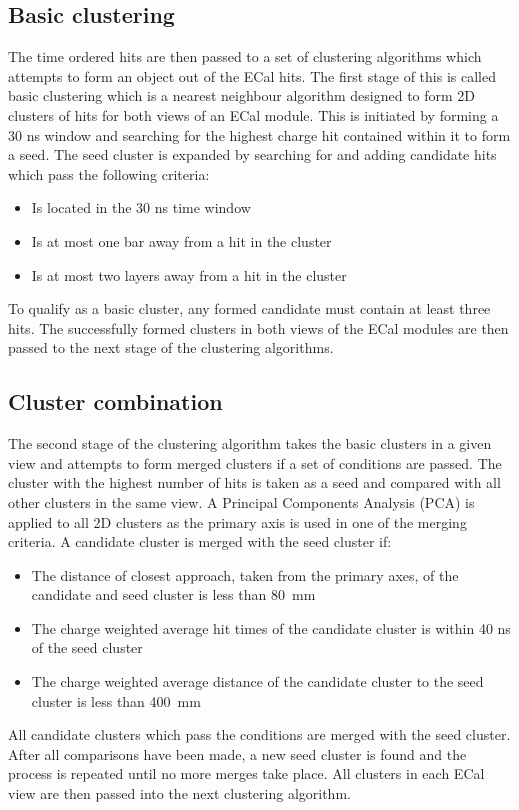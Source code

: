 \subsection{Basic clustering}
\label{subsec:ECalBasicClustering}
The time ordered hits are then passed to a set of clustering algorithms which attempts to form an object out of the ECal hits.  The first stage of this is called basic clustering which is a nearest neighbour algorithm designed to form 2D clusters of hits for both views of an ECal module.  This is initiated by forming a 30 ns window and searching for the highest charge hit contained within it to form a seed.  The seed cluster is expanded by searching for and adding candidate hits which pass the following criteria:
\begin{itemize}
  \item Is located in the 30 ns time window
  \item Is at most one bar away from a hit in the cluster
  \item Is at most two layers away from a hit in the cluster
\end{itemize}
To qualify as a basic cluster, any formed candidate must contain at least three hits.  The successfully formed clusters in both views of the ECal modules are then passed to the next stage of the clustering algorithms. 

\subsection{Cluster combination}
\label{subsec:ECalCombineClusters}
The second stage of the clustering algorithm takes the basic clusters in a given view and attempts to form merged clusters if a set of conditions are passed.  The cluster with the highest number of hits is taken as a seed and compared with all other clusters in the same view.  A Principal Components Analysis (PCA) is applied to all 2D clusters as the primary axis is used in one of the merging criteria.  A candidate cluster is merged with the seed cluster if:
\begin{itemize}
  \item The distance of closest approach, taken from the primary axes, of the candidate and seed cluster is less than 80~mm
  \item The charge weighted average hit times of the candidate cluster is within 40 ns of the seed cluster
  \item The charge weighted average distance of the candidate cluster to the seed cluster is less than 400~mm
\end{itemize}
All candidate clusters which pass the conditions are merged with the seed cluster.  After all comparisons have been made, a new seed cluster is found and the process is repeated until no more merges take place.  All clusters in each ECal view are then passed into the next clustering algorithm.



